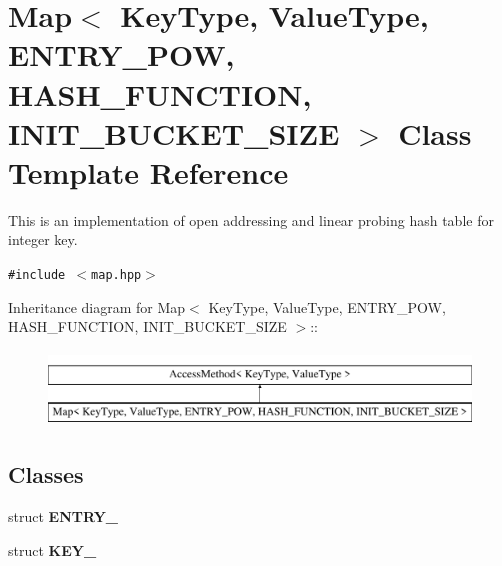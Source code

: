 \hypertarget{classMap}{
\section{Map$<$ KeyType, ValueType, ENTRY\_\-POW, HASH\_\-FUNCTION, INIT\_\-BUCKET\_\-SIZE $>$ Class Template Reference}
\label{classMap}
}
This is an implementation of open addressing and linear probing hash table for integer key.  


{\tt \#include $<$map.hpp$>$}

Inheritance diagram for Map$<$ KeyType, ValueType, ENTRY\_\-POW, HASH\_\-FUNCTION, INIT\_\-BUCKET\_\-SIZE $>$::\begin{figure}[H]
\begin{center}
\leavevmode
\includegraphics[height=2cm]{classMap}
\end{center}
\end{figure}
\subsection*{Classes}
\begin{CompactItemize}
\item 
struct \textbf{ENTRY\_\-}
\item 
struct \textbf{KEY\_\-}
\end{CompactItemize}
